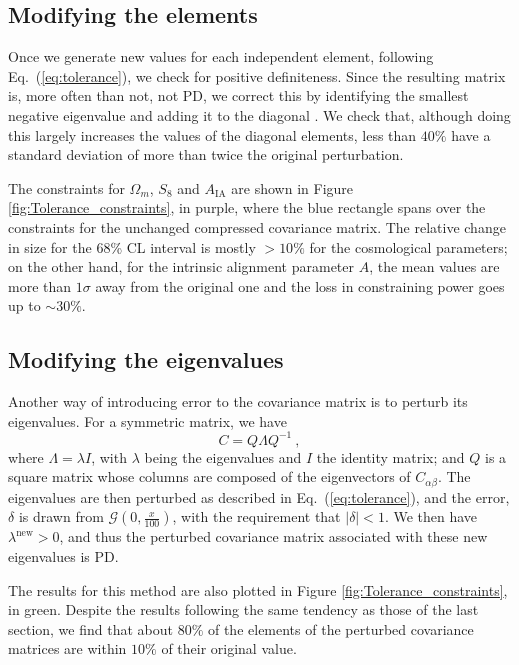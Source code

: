 \documentclass[aps, prd, twocolumn, superscriptaddress, nofootinbib, amssymb, amsmath]{revtex4-2}
\newcommand{\rf}[1]{Figure \ref{fig:#1}}
\newcommand{\ec}[1]{Eq.~(\ref{eq:#1})}
\newcommand\be{\begin{equation}}
\newcommand\ee{\end{equation}}
\begin{document}
\subsection{Modifying the elements}

Once we generate new values for each independent element, following \ec{tolerance}, we check for positive definiteness. Since the resulting matrix is, more often than not, not PD, we correct this by identifying the smallest negative eigenvalue and adding it to the diagonal \cite{Yuan:2008}. We check that, although doing this largely increases the values of the diagonal elements, less than $40 \%$ have a standard deviation of more than twice the original perturbation. 

The constraints for $\Omega_m$, $S_8$ and $A_{\text{IA}}$ are shown in \rf{Tolerance_constraints}, in purple, where the blue rectangle spans over the constraints for the unchanged compressed covariance matrix. The relative change in size for the 68\% CL interval is mostly $> 10 \%$ for the cosmological parameters; on the other hand, for the intrinsic alignment parameter $A$, the mean values are more than $1\sigma$ away from the original one and the loss in constraining power goes up to $\sim 30 \%$.

\subsection{Modifying the eigenvalues}

Another way of introducing error to the covariance matrix is to perturb its eigenvalues. For a symmetric matrix, we have
\be
C = Q\Lambda Q^{-1}\ 
,\ee
where $\Lambda = \lambda I$, with $\lambda$ being the eigenvalues and $I$ the identity matrix; and $Q$ is a square matrix whose columns are composed of the eigenvectors of $C_{\alpha \beta}$. The eigenvalues are then perturbed as described in \ec{tolerance}, and the error, $\delta$ is drawn from $\mathcal{G}(0,\frac{x}{100})$, with the requirement that $|\delta| < 1$. We then have $\lambda^{\text{new}} > 0$, and thus the perturbed covariance matrix associated with these new eigenvalues is PD. 

The results for this method are also plotted in \rf{Tolerance_constraints}, in green. Despite the results following the same tendency as those of the last section, we find that about $80\%$ of the elements of the perturbed covariance matrices are within $10\%$ of their original value.
\end{document}

